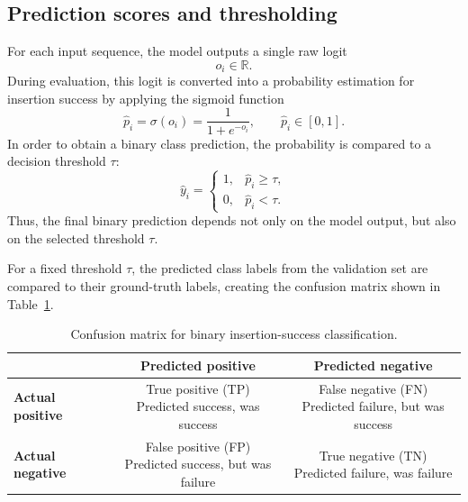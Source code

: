\subsection{Prediction scores and thresholding}
For each input sequence, the model outputs a single raw logit
\begin{equation}
o_i \in \mathbb{R}.
\end{equation}
During evaluation, this logit is converted into a probability estimation for insertion success by applying the sigmoid function
\begin{equation}
\hat{p}_i = \sigma(o_i) = \frac{1}{1 + e^{-o_i}},
\qquad \hat{p}_i \in [0,1].
\end{equation}
In order to obtain a binary class prediction, the probability is compared to a decision threshold \(\tau\):
\begin{equation}
\hat{y}_i =
\begin{cases}
1, & \hat{p}_i \ge \tau,\\
0, & \hat{p}_i < \tau.
\end{cases}
\end{equation}
Thus, the final binary prediction depends not only on the model output, but also on the selected threshold \(\tau\).

For a fixed threshold \(\tau\), the predicted class labels from the validation set are compared to their ground-truth labels, creating the confusion matrix shown in Table~\ref{tab:confusion_matrix_binary}.

\begin{table}[htbp]
\centering
\caption{Confusion matrix for binary insertion-success classification.}
\label{tab:confusion_matrix_binary}
\renewcommand{\arraystretch}{1.15}
\begin{tabular}{lc|c}
\toprule
 & \textbf{Predicted positive} & \textbf{Predicted negative} \\
\midrule
\textbf{Actual positive} & \makecell{True positive (TP) \\ Predicted success, was success} & \makecell{False negative (FN)\\ Predicted failure, but was success} \\
\hline
\textbf{Actual negative} & \makecell{False positive (FP) \\ Predicted success, but was failure} & \makecell{True negative (TN) \\ Predicted failure, was failure} \\
\bottomrule
\end{tabular}
\end{table}

